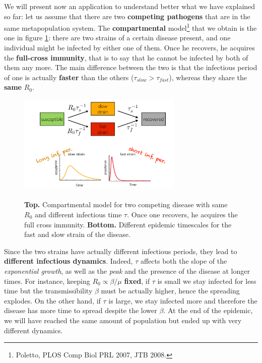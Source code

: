 \documentclass[../main/main.tex]{subfiles}
\begin{document}
We will present now an application to understand better what we have explained so far: let us assume that there are two \textbf{competing pathogens} that are in the same metapopulation system. The \textbf{compartmental} model\footnote{Poletto, PLOS Comp Biol PRL 2007, JTB 2008.} that we obtain is the one in figure \ref{fig:16_08}: there are two strains of a certain disease present, and one individual might be infected by either one of them. Once he recovers, he acquires the \textbf{full-cross immunity}, that is to say that he cannot be infected by both of them any more. The main difference between the two is that the infectious period of one is actually \textbf{faster} than the others ($\tau_{slow} > \tau_{fast}$), whereas they share the \textbf{same} $R_0$.

\begin{figure}[h!]
\centering
\includegraphics[width=0.7\textwidth]{../lessons/image/16/image08.png}
\caption{\label{fig:16_08}\\
\textbf{Top.} Compartmental model for two competing disease with same $R_0$ and different infectious time $\tau$. Once one recovers, he acquires the full cross immunity.
\textbf{Bottom.} Different epidemic timescales for the fast and slow strain of the disease.}
\end{figure}

Since the two strains have actually different infectious periods, they lead to \textbf{different infectious dynamics}. Indeed, $\tau$ affects both the slope of the \textit{exponential growth}, as well as the \textit{peak} and the presence of the disease at longer times. For instance, keeping $R_0 \propto \beta/\mu $ \textbf{fixed}, if $\tau$ is small we stay infected for less time but the transmissibility $\beta$ must be actually higher, hence the spreading explodes. On the other hand, if $\tau$ is large, we stay infected more and therefore the disease has more time to spread despite the lower $\beta$. At the end of the epidemic, we will have reached the same amount of population but ended up with very different dynamics.
\end{document}
